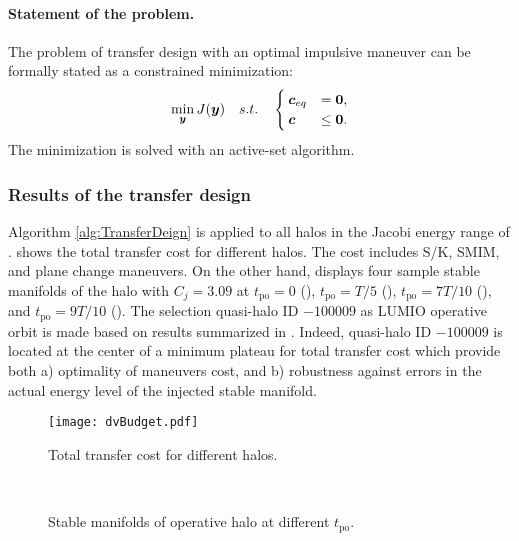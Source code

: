 \paragraph{Statement of the problem.}
	The problem of transfer design with an optimal impulsive maneuver can be formally stated as a constrained minimization:
	\begin{align}\label{pb:minimizaionTransferDesign}
	\min_{\boldsymbol{y}}{J(\boldsymbol{y})}\quad s.t. \quad
	\begin{cases}
	\boldsymbol{c}_{eq} &= \boldsymbol{0}, \\
	\boldsymbol{c} &\le \boldsymbol{0}.
	\end{cases}
	\end{align}
The minimization is solved with an active-set algorithm.


\subsubsection{Results of the transfer design }\label{subsubsec:TransferDesignResults}
Algorithm \ref{alg:TransferDeign} is applied to all halos in the Jacobi energy range of .  shows the total transfer cost for different halos. The cost includes S/K, SMIM, and plane change maneuvers. On the other hand,  displays four sample stable manifolds of the halo with $C_j = 3.09$ at $t_{\textrm{po}}=0$ (), $t_{\textrm{po}}=T/5$ (), $t_{\textrm{po}}=7T/10$ (), and $t_{\textrm{po}}=9T/10$ (). The selection quasi-halo ID $-100009$ as LUMIO operative orbit is made based on results summarized in . Indeed, quasi-halo ID $-100009$ is located at the center of a minimum plateau for total transfer cost which provide both a) optimality of maneuvers cost, and b) robustness against errors in the actual energy level of the injected stable manifold.
%
\begin{figure*}[t!]
	\centering
	\texttt{[image: dvBudget.pdf]}
	\caption{Total transfer cost for different halos.}
	\label{fig:TotalTransferCost}
\end{figure*}
%
%
\begin{figure}[b!]
	\centering
	\hfill
	\hfill
	 \\
	\hfill
	\hfill
	\hfill
	\caption{Stable manifolds of operative halo at different $t_{\textrm{po}}$.}
	\label{fig:Halo9SampleStableManifold}
\end{figure}
%

